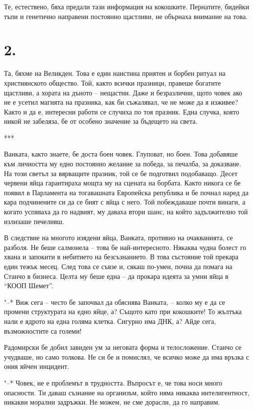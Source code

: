 \documentclass[ebook,openany,12pt]{memoir}
\begin{document}
Те, естествено, бяха предали тази информация на кокошките. Пернатите, бидейки тъпи и генетично направени постоянно щастливи, не обърнаха внимание на това.

\section*{2.}

Та, бяхме на Великден. Това е един наистина приятен и борбен ритуал на християнското общество. Той, както всички празници, правеше богатите щастливи, а хората на дъното – нещастни. Даже и безразлични, щото човек ако не е усетил магията на празника, как би съжалявал, че не може да я изживее? Както и да е, интересни работи се случиха по тоя празник. Една случка, която никой не забеляза, бе от особено значение за бъдещето на света.

***

Ванката, както знаете, бе доста боен човек. Глуповат, но боен. Това добавяше към личността му едно постоянно желание за победа, за печалба, за доказване. На този светъл за вярващите празник, той се бе подготвил подобаващо. Десет червени яйца гарантираха мощта му на сцената на борбата. Както никога се бе появил в Парламента на тогавашната Европейска република и бе почнал наред да кара подчинените си да се бият с яйца с него. Той побеждаваше почти винаги, а когато успяваха да го надвият, му даваха втори шанс, на който задължително той излизаше печеливш. 

В следствие на многото изядени яйца, Ванката, противно на очакванията, се разболя. Не беше салмонела – това бе най-интересното. Някаква чудна болест го хвана и запокити в небитието на безсъзнанието. В това състояние той прекара един тежък месец. След това се съвзе и, сякаш по-умен, почна да помага на Станчо в бизнеса. Целта му беше една – да прокара идеята за умни яйца в ``КООП Шемет''.

"--* Виж сега -- често бе започвал да обяснява Ванката, – колко му е да се промени структурата на едно яйце, а? Същото като при кокошките! То жълтъка нали е ядрото на една голяма клетка. Сигурно има ДНК, а? Айде сега, възможностите са големи!

Радомирски бе добил завиден ум за неговата форма и телосложение. Станчо се учудваше, но само толкова. Не си бе и помислял, че всичко може да има връзка с ония яйчен инцидент. 

"--* Човек, не е проблемът в трудността. Въпросът е, че това носи много опасности. Ти даваш съзнание на организъм, който няма никаква интелигентност, никакви морални задръжки. Не можем, не сме дорасли, да го направим. 
\end{document}
